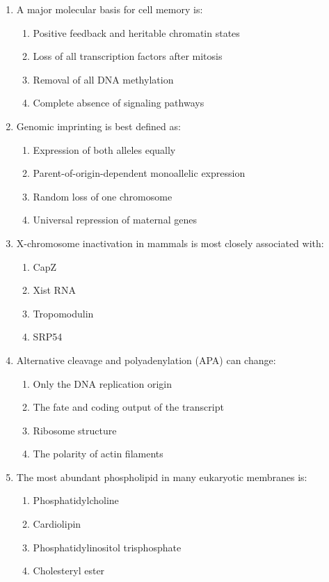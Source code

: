 \documentclass[12pt,fontset=none]{ctexart}
\begin{document}
\begin{enumerate}
\item A major molecular basis for cell memory is:
\begin{enumerate}[label=\alph*.]
\item Positive feedback and heritable chromatin states
\item Loss of all transcription factors after mitosis
\item Removal of all DNA methylation
\item Complete absence of signaling pathways
\end{enumerate}

\item Genomic imprinting is best defined as:
\begin{enumerate}[label=\alph*.]
\item Expression of both alleles equally
\item Parent-of-origin-dependent monoallelic expression
\item Random loss of one chromosome
\item Universal repression of maternal genes
\end{enumerate}

\item X-chromosome inactivation in mammals is most closely associated with:
\begin{enumerate}[label=\alph*.]
\item CapZ
\item Xist RNA
\item Tropomodulin
\item SRP54
\end{enumerate}

\item Alternative cleavage and polyadenylation (APA) can change:
\begin{enumerate}[label=\alph*.]
\item Only the DNA replication origin
\item The fate and coding output of the transcript
\item Ribosome structure
\item The polarity of actin filaments
\end{enumerate}

\item The most abundant phospholipid in many eukaryotic membranes is:
\begin{enumerate}[label=\alph*.]
\item Phosphatidylcholine
\item Cardiolipin
\item Phosphatidylinositol trisphosphate
\item Cholesteryl ester
\end{enumerate}


\end{enumerate}
\end{document}
